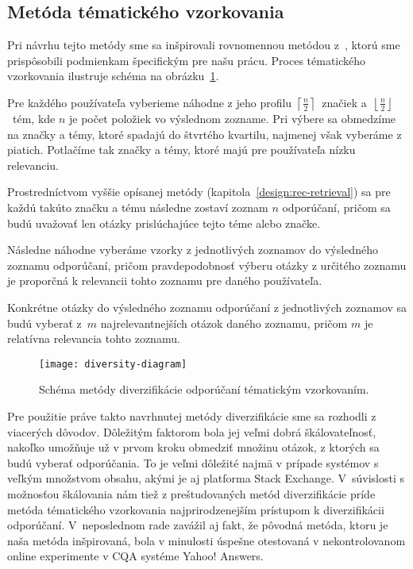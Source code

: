 \subsection{Metóda tématického vzorkovania}
\label{sec:thematic-sampling}
Pri návrhu tejto metódy sme sa inšpirovali rovnomennou metódou z~\cite{Szpektor2013}, ktorú sme prispôsobili
podmienkam špecifickým pre našu prácu. Proces tématického vzorkovania ilustruje schéma na obrázku~\ref{fig:tematic-sampling}.
\begin{my_enumerate}
\item{Pre každého používateľa vyberieme náhodne z jeho profilu $\left\lceil\frac{n}{2}\right\rceil$~značiek
    a~$\left\lfloor\frac{n}{2}\right\rfloor$~tém, kde $n$ je počet položiek vo výslednom zozname. Pri výbere sa obmedzíme na značky a témy,
    ktoré spadajú do štvrtého kvartilu, najmenej však vyberáme z piatich. Potlačíme tak značky a témy, ktoré majú pre používateľa nízku relevanciu.}
\item{
    Prostredníctvom vyššie opísanej metódy (kapitola~\ref{design:rec-retrieval}) sa pre každú takúto značku a tému
    následne zostaví zoznam $n$ odporúčaní, pričom sa budú uvažovať len otázky prislúchajúce tejto téme alebo značke.}
\item{
    Následne náhodne vyberáme vzorky z jednotlivých zoznamov do výsledného zoznamu odporúčaní, pričom pravdepodobnosť
    výberu otázky z určitého zoznamu je proporčná k relevancii tohto zoznamu pre daného používateľa.}
\item{
    Konkrétne otázky do výsledného zoznamu odporúčaní z jednotlivých zoznamov sa budú vyberať z~$m$ najrelevantnejších otázok daného zoznamu,
    pričom $m$ je relatívna relevancia tohto zoznamu.}
\end{my_enumerate}

\begin{figure}[H]\begin{center}
\texttt{[image: diversity-diagram]}
\caption{Schéma metódy diverzifikácie odporúčaní tématickým vzorkovaním.\label{fig:tematic-sampling}}\end{center}
\end{figure}

Pre použitie práve takto navrhnutej metódy diverzifikácie sme sa rozhodli z viacerých dôvodov. Dôležitým faktorom bola
jej veľmi dobrá škálovateľnosť, nakoľko umožňuje už v prvom kroku obmedziť množinu otázok, z ktorých sa budú vyberať odporúčania.
To je veľmi dôležité najmä v prípade systémov s veľkým množstvom obsahu, akými je aj platforma Stack Exchange.
V~súvislosti s možnosťou škálovania nám tiež z preštudovaných metód diverzifikácie príde metóda tématického vzorkovania
najprirodzenejším prístupom k diverzifikácii odporúčaní. V~neposlednom rade zavážil aj fakt, že pôvodná metóda,
ktoru je naša metóda inšpirovaná, bola v minulosti úspešne otestovaná v nekontrolovanom online experimente
v CQA systéme Yahoo! Answers.

